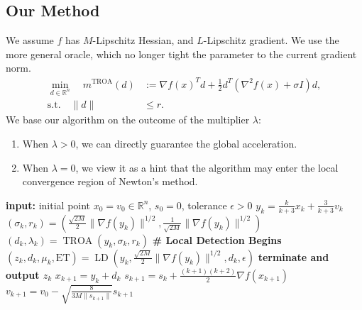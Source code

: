 \documentclass{mcom-l}
\numberwithin{equation}{section}
\begin{document}
\subsection{Our Method}
We assume $f$ has $M$-Lipschitz Hessian, and $L$-Lipschitz gradient. We use the more general oracle, which no longer tight the parameter to the current gradient norm.
\begin{equation*}
    \begin{aligned}
        \min_{d \in \mathbb{R}^n} \quad m^{\text{TROA}}(d) & := \nabla f(x)^T d + \tfrac{1}{2} d^T (\nabla^2 f(x) + \sigma I) d, \\
        \text{s.t.} \quad \|d\|                            & \le r.
    \end{aligned}
\end{equation*}
We base our algorithm on the outcome of the multiplier $\lambda$:
\begin{enumerate}
    \item When $\lambda>0$, we can directly guarantee the global acceleration.
    \item When $\lambda = 0$, we view it as a hint that the algorithm may enter the local convergence region of Newton's method.
\end{enumerate}
\begin{algorithm}[ht]
    \caption{Global-Local Accelerated Trust-Region Method (\atr{})}\label{alg.accelerated utr}
    \begin{algorithmic}[1]
        \STATE \textbf{input:} initial point $x_0=v_0\in \mathbb{R}^n$, $s_0=0$, tolerance $\epsilon>0$
        \STATE $y_k = \frac{k}{k+3}x_k+\frac{3}{k+3}v_k$
        \STATE $(\sigma_k,r_k) = (\tfrac{\sqrt{2M}}{2}\|\nabla f(y_k)\|^{1/2},\tfrac{1}{\sqrt{2M}}\|\nabla f(y_k)\|^{1/2})$
        \STATE $(d_k,\lambda_k) = \operatorname{TROA}(y_k,\sigma_k,r_k)$
         \label{line.if}
        \STATE \textbf{\# Local Detection Begins}
        \STATE $(z_k,d_k,\mu_k,\text{ET}) = \operatorname{LD}(y_k,\tfrac{\sqrt{2M}}{2}\|\nabla f(y_k)\|^{1/2},d_k,\epsilon)$
        \label{line.early terminate main}
        \STATE \textbf{terminate and output $z_k$}
        \ENDIF
        \ENDIF
        \STATE $x_{k+1}=y_k+d_k$
        \STATE $s_{k+1} = s_{k}+\tfrac{(k+1)(k+2)}{2}\nabla f(x_{k+1})$
        \STATE $v_{k+1} = v_0-\sqrt{\tfrac{8}{3M\|s_{k+1}\|}}s_{k+1}$
        \ENDFOR
    \end{algorithmic}
\end{algorithm}
\end{document}
